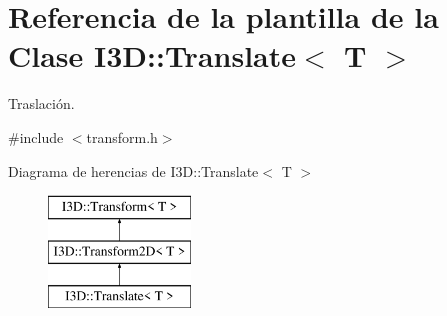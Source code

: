 \hypertarget{class_i3_d_1_1_translate}{}\section{Referencia de la plantilla de la Clase I3D\+:\+:Translate$<$ T $>$}
\label{class_i3_d_1_1_translate}


Traslación.  




{\ttfamily \#include $<$transform.\+h$>$}

Diagrama de herencias de I3D\+:\+:Translate$<$ T $>$\begin{figure}[H]
\begin{center}
\leavevmode
\includegraphics[height=3.000000cm]{class_i3_d_1_1_translate}
\end{center}
\end{figure}
